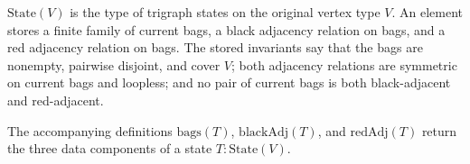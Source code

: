 \(\mathrm{State}(V)\) is the type of trigraph states on the original
vertex type \(V\).  An element stores a finite family of current bags, a black
adjacency relation on bags, and a red adjacency relation on bags.  The stored
invariants say that the bags are nonempty, pairwise disjoint, and cover \(V\);
both adjacency relations are symmetric on current bags and loopless; and no
pair of current bags is both black-adjacent and red-adjacent.

The accompanying definitions \(\mathrm{bags}(T)\),
\(\mathrm{blackAdj}(T)\), and \(\mathrm{redAdj}(T)\) return the
three data components of a state \(T:\mathrm{State}(V)\).

